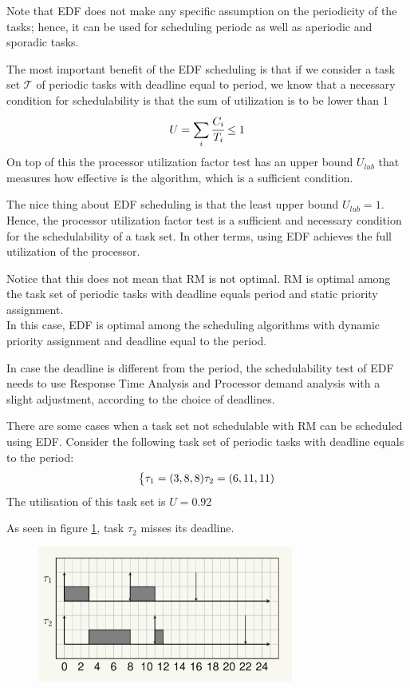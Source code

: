 Note that EDF does not make any specific assumption on the periodicity of the tasks; hence, it can be used for scheduling periodc as well as aperiodic and sporadic tasks.

The most important benefit of the EDF scheduling is that if we consider a task set $\mathcal{T}$ of periodic tasks with deadline equal to period, we know that a necessary condition for schedulability is that the sum of utilization is to be lower than 1
\[U = \sum_i\cfrac{C_i}{T_i} \le 1\]
On top of this the processor utilization factor test has an upper bound $U_{lub}$ that measures how effective is the algorithm, which is a sufficient condition.

The nice thing about EDF scheduling is that the least upper bound $U_{lub}=1$. Hence, the processor utilization factor test is a sufficient and necessary condition for the schedulability of a task set.
In other terms, using EDF achieves the full utilization of the processor.

Notice that this does not mean that RM is not optimal. RM is optimal among the task set of periodic tasks with deadline equals period and static priority assignment.\\
In this case, EDF is optimal among the scheduling algorithms with dynamic priority assignment and deadline equal to the period.

In case the deadline is different from the period, the schedulability test of EDF needs to use Response Time Analysis and Processor demand analysis with a slight adjustment, according to the choice of deadlines.

There are some cases when a task set not schedulable with RM can be scheduled using EDF. Consider the following task set of periodic tasks with deadline equals to the period:
\[
\begin{dcases}
    \tau_1 = (3,8,8)
    \tau_2 = (6,11,11)
\end{dcases}    
\]
The utilisation of this task set is $U = 0.92$

As seen in figure \ref{fig:image14}, task $\tau_2$ misses its deadline.
\begin{figure}[!h]
    \centering
    \includegraphics[width = 0.75\textwidth]{images/image14}
    \caption{}
    \label{fig:image14}
\end{figure}

